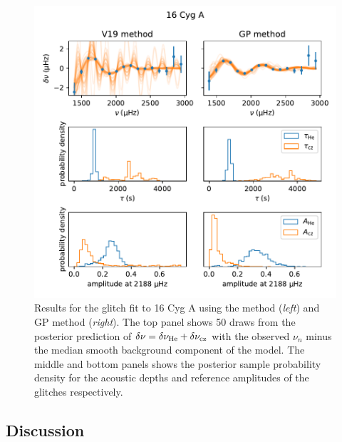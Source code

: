 \begin{figure}[!tb]
    \centering
    \includegraphics{figures/glitch-16cyga.pdf}
    \caption{Results for the glitch fit to 16 Cyg A using the  method (\emph{left}) and GP method (\emph{right}). The top panel shows 50 draws from the posterior prediction of \(\delta\nu = \delta\nu_{{\mathrm{He}}} + \delta\nu_{{\mathrm{cz}}}\) with the observed \(\nu_n\) minus the median smooth background component of the model. The middle and bottom panels shows the posterior sample probability density for the acoustic depths and reference amplitudes of the glitches respectively.}
    \label{fig:glitch-16cyga}
\end{figure}

\subsection{Discussion}\label{sec:glitch-disc}


